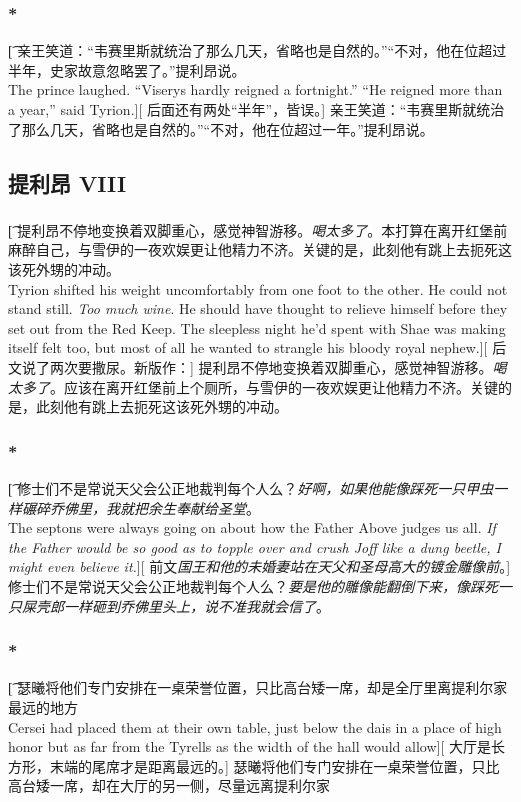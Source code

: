 \documentclass[12pt,a4paper]{article}
\begin{document}
	
\subsubsection{\color{red}*}\t[
	亲王笑道：“韦赛里斯就统治了那么几天，省略也是自然的。”“不对，他在位超过半年，史家故意忽略罢了。”提利昂说。\\
	The prince laughed. “Viserys hardly reigned a fortnight.” “He reigned more than a year,” said Tyrion.][
	后面还有两处“半年”，皆误。]
	亲王笑道：“韦赛里斯就统治了那么几天，省略也是自然的。”“不对，他在位超过一年。”提利昂说。
	
\subsection{提利昂 VIII}

\subsubsection{}\t[
提利昂不停地变换着双脚重心，感觉神智游移。\emph{喝太多了}。本打算在离开红堡前麻醉自己，与雪伊的一夜欢娱更让他精力不济。关键的是，此刻他有跳上去扼死这该死外甥的冲动。\\
Tyrion shifted his weight uncomfortably from one foot to the other. He could not stand still. \emph{Too much wine}. He should have thought to relieve himself before they set out from the Red Keep. The sleepless night he'd spent with Shae was making itself felt too, but most of all he wanted to strangle his bloody royal nephew.][
后文说了两次要撒尿。新版作：]
提利昂不停地变换着双脚重心，感觉神智游移。\emph{喝太多了}。应该在离开红堡前上个厕所，与雪伊的一夜欢娱更让他精力不济。关键的是，此刻他有跳上去扼死这该死外甥的冲动。

\subsubsection{\color{red}*}\t[
		修士们不是常说天父会公正地裁判每个人么？\emph{好啊，如果他能像踩死一只甲虫一样碾碎乔佛里，我就把余生奉献给圣堂}。\\
		The septons were always going on about how the Father Above judges us all. \emph{If the Father would be so good as to topple over and crush Joff like a dung beetle, I might even believe it.}][
		前文\emph{国王和他的未婚妻站在天父和圣母高大的镀金雕像前}。]
		修士们不是常说天父会公正地裁判每个人么？\emph{要是他的雕像能翻倒下来，像踩死一只屎壳郎一样砸到乔佛里头上，说不准我就会信了}。
			
\subsubsection{\color{red}*}\t[
瑟曦将他们专门安排在一桌荣誉位置，只比高台矮一席，却是全厅里离提利尔家最远的地方\\
Cersei had placed them at their own table, just below the dais in a place of high honor but as far from the Tyrells as the width of the hall would allow][
大厅是长方形，末端的尾席才是距离最远的。]
瑟曦将他们专门安排在一桌荣誉位置，只比高台矮一席，却在大厅的另一侧，尽量远离提利尔家
\end{document}
